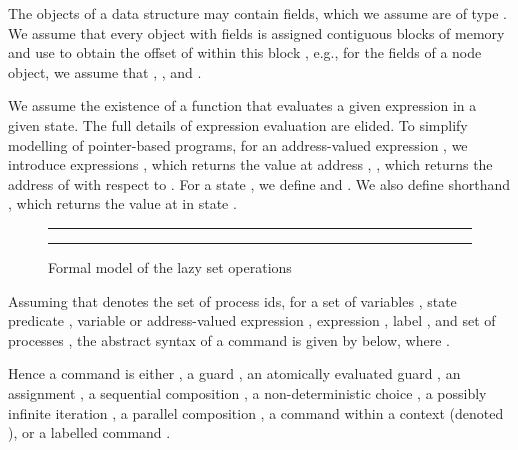 \documentclass{article}
\def\figrule{\rule{\columnwidth}{0.5pt}}
\theoremstyle{plain}
\theoremstyle{definition}
\begin{document}
The objects of a data structure may contain fields, which we assume
are of type . We assume that every object with  fields is
assigned  contiguous blocks of memory and use  to obtain the offset of  within this block
\cite{Vaf07}, e.g., for the fields of a node object, we assume that
, ,  and .

We assume the existence of a function  that evaluates a given
expression in a given state. The full details of expression evaluation
are elided. To simplify modelling of pointer-based programs, for an
address-valued expression , we introduce expressions ,
which returns the value at address , , which returns
the address of  with respect to . For a state , we
define  and
. We also define
shorthand , which returns
the value at  in state .



\begin{figure}[!t]
  \centering
  \figrule \small

  
  \smallskip
  
  
  \figrule
  \caption{Formal model of the lazy set operations}
  \label{fig:formal-lazyset}
\end{figure}



Assuming that  denotes the set of process ids, for a set of
variables , state predicate , variable or address-valued
expression , expression , label , and set of processes , the abstract syntax of a command is given by 
below, where .

Hence a command is either , a
guard , an atomically evaluated guard , an assignment , a
sequential composition , a non-deterministic choice , a possibly infinite
iteration , a parallel composition , a
command  within a context  (denoted ), or a labelled 
command . 
\end{document}
